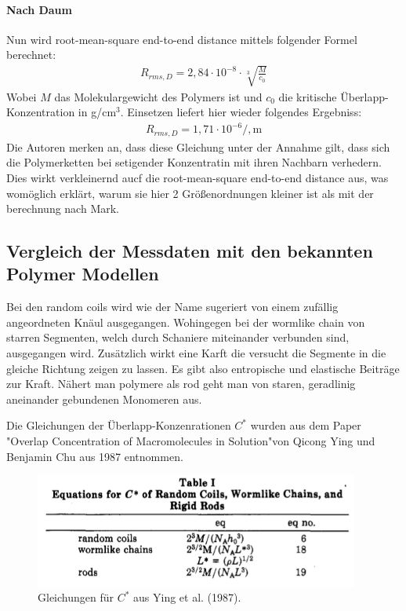 \paragraph*{Nach Daum}
Nun wird root-mean-square end-to-end distance mittels folgender Formel berechnet:
\begin{gather}
	R_{rms,D} = 2,84 \cdot 10^{-8} \cdot \sqrt[3]{\frac{M}{c_0}}
\end{gather}
Wobei $M$ das Molekulargewicht des Polymers ist und $c_0$ die kritische Überlapp-Konzentration in g/cm$^3$.
Einsetzen liefert hier wieder folgendes Ergebniss:
\begin{gather}
	R_{rms,D} = 1,71 \cdot 10^{-6} /, \text{m}
\end{gather}
Die Autoren merken an, dass diese Gleichung unter der Annahme gilt, dass sich die Polymerketten bei setigender Konzentratin mit ihren Nachbarn verhedern. Dies wirkt verkleinernd aucf die root-mean-square end-to-end distance aus, was womöglich erklärt, warum sie hier 2 Größenordnungen kleiner ist als mit der berechnung nach Mark.

\newpage
\subsection{Vergleich der Messdaten mit den bekannten Polymer Modellen}

Bei den random coils wird wie der Name sugeriert von einem zufällig angeordneten Knäul ausgegangen. Wohingegen bei der wormlike chain von starren Segmenten, welch durch Schaniere miteinander verbunden sind, ausgegangen wird. Zusätzlich wirkt eine Karft die versucht die Segmente in die gleiche Richtung zeigen zu lassen. Es gibt also entropische und elastische Beiträge zur Kraft. Nähert man polymere als rod geht man von staren, geradlinig aneinander gebundenen Monomeren aus.

Die Gleichungen der Überlapp-Konzenrationen  $C^*$ wurden aus dem Paper "Overlap Concentration of Macromolecules in Solution"von Qicong Ying und Benjamin Chu aus 1987 entnommen.


\begin{figure}[h]
	\includegraphics[width=0.95\textwidth]{Bilder/Auswertung/43/YingT1.png}
	\caption[short]{Gleichungen für $C^*$ aus Ying et al. (1987).}
\end{figure}

